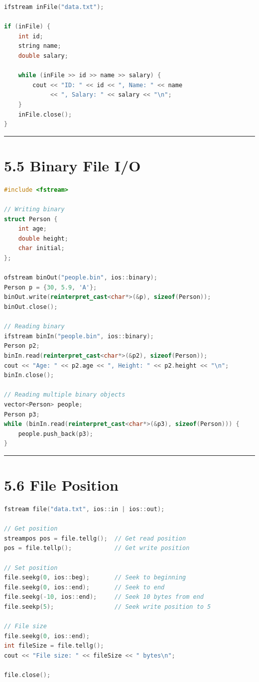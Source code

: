 \begin{lstlisting}[language={C++}]
ifstream inFile("data.txt");

if (inFile) {
    int id;
    string name;
    double salary;
    
    while (inFile >> id >> name >> salary) {
        cout << "ID: " << id << ", Name: " << name 
             << ", Salary: " << salary << "\n";
    }
    inFile.close();
}
\end{lstlisting}

\begin{center}\rule{0.5\linewidth}{0.5pt}\end{center}

\hypertarget{binary-file-io}{%
\section{5.5 Binary File I/O}\label{binary-file-io}}

\begin{lstlisting}[language={C++}]
#include <fstream>

// Writing binary
struct Person {
    int age;
    double height;
    char initial;
};

ofstream binOut("people.bin", ios::binary);
Person p = {30, 5.9, 'A'};
binOut.write(reinterpret_cast<char*>(&p), sizeof(Person));
binOut.close();

// Reading binary
ifstream binIn("people.bin", ios::binary);
Person p2;
binIn.read(reinterpret_cast<char*>(&p2), sizeof(Person));
cout << "Age: " << p2.age << ", Height: " << p2.height << "\n";
binIn.close();

// Reading multiple binary objects
vector<Person> people;
Person p3;
while (binIn.read(reinterpret_cast<char*>(&p3), sizeof(Person))) {
    people.push_back(p3);
}
\end{lstlisting}

\begin{center}\rule{0.5\linewidth}{0.5pt}\end{center}

\hypertarget{file-position}{%
\section{5.6 File Position}\label{file-position}}

\begin{lstlisting}[language={C++}]
fstream file("data.txt", ios::in | ios::out);

// Get position
streampos pos = file.tellg();  // Get read position
pos = file.tellp();            // Get write position

// Set position
file.seekg(0, ios::beg);       // Seek to beginning
file.seekg(0, ios::end);       // Seek to end
file.seekg(-10, ios::end);     // Seek 10 bytes from end
file.seekp(5);                 // Seek write position to 5

// File size
file.seekg(0, ios::end);
int fileSize = file.tellg();
cout << "File size: " << fileSize << " bytes\n";

file.close();
\end{lstlisting}

